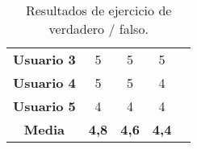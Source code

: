 \begin{table}[H]
{\begin{tabular}{c|ccc|l}
            \multicolumn{1}{|c|}{\textbf{Usuario 3}} & \multicolumn{1}{c|}{5}                                                                                                                                          & \multicolumn{1}{c|}{5}                                                                                                                                                                 & 5                                                                                                                                                                                   & \\ \cline{1-4}
            \multicolumn{1}{|c|}{\textbf{Usuario 4}} & \multicolumn{1}{c|}{5}                                                                                                                                          & \multicolumn{1}{c|}{5}                                                                                                                                                                 & 4                                                                                                                                                                                   & \\ \cline{1-4}
            \multicolumn{1}{|c|}{\textbf{Usuario 5}} & \multicolumn{1}{c|}{4}                                                                                                                                          & \multicolumn{1}{c|}{4}                                                                                                                                                                 & 4                                                                                                                                                                                   & \\ \cline{1-4}
            \multicolumn{1}{|c|}{\textbf{Media}}     & \multicolumn{1}{c|}{\textbf{4,8}}                                                                                                                               & \multicolumn{1}{c|}{\textbf{4,6}}                                                                                                                                                      & \textbf{4,4}                                                                                                                                                                        & \\ \cline{1-4}
        \end{tabular}
    }
    \caption{Resultados de ejercicio de verdadero / falso.}
    \label{tab:resultadosVF}
\end{table}

